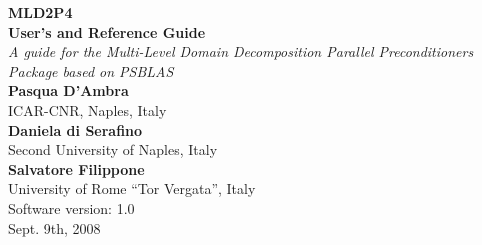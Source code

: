 \documentclass[a4paper,twoside,11pt]{article}
\begin{document}
{\LARGE\bfseries MLD2P4\\[.8ex] User's and Reference Guide}\\[\baselineskip]
\emph{\large A guide for the Multi-Level Domain Decomposition 
Parallel Preconditioners Package
based on PSBLAS}\\[3ex]
{\bfseries Pasqua D'Ambra}\\
 ICAR-CNR, Naples, Italy\\
{\bfseries Daniela di Serafino}\\
 Second University of Naples, Italy\\
{\bfseries Salvatore Filippone} \\
 University of Rome ``Tor Vergata'', Italy\\[2ex]
Software version: 1.0\\
Sept. 9th, 2008
\clearpage
\ \\
\thispagestyle{empty}
\clearpage

\setcounter{page}{1}    %


\cleardoublepage

\begingroup
  \renewcommand*{\thepage}{toc}
  \tableofcontents
\endgroup  
\cleardoublepage

\setcounter{page}{1}    %







%

%
\cleardoublepage
\appendix

\cleardoublepage

\end{document}
